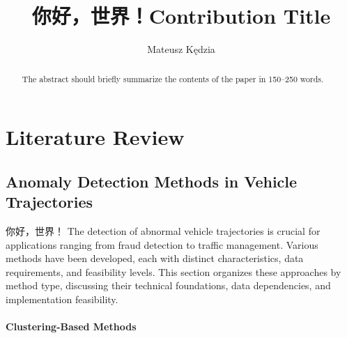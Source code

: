 \documentclass[runningheads]{llncs}
\newcommand{\zh}[1]{{\chinesefont #1}}
\begin{document}

\title{ \zh{你好，世界！}Contribution Title}
%
%
\author{Mateusz Kędzia}
%
\authorrunning{ \zh{你好，世界！} Author et al.}
%
%
\maketitle      %
%
\begin{abstract}
The abstract should briefly summarize the contents of the paper in
150--250 words.

\end{abstract}
%
%
\newpage

\section{Literature Review}
\label{sec:literature-review}

\subsection{Anomaly Detection Methods in Vehicle Trajectories}
\label{subsec:anomaly-detection-methods}
 \zh{你好，世界！}
The detection of abnormal vehicle trajectories is crucial for applications ranging from fraud detection to traffic management. Various methods have been developed, each with distinct characteristics, data requirements, and feasibility levels. This section organizes these approaches by method type, discussing their technical foundations, data dependencies, and implementation feasibility.

\paragraph{Clustering-Based Methods}
\label{par:clustering-methods}
\end{document}
